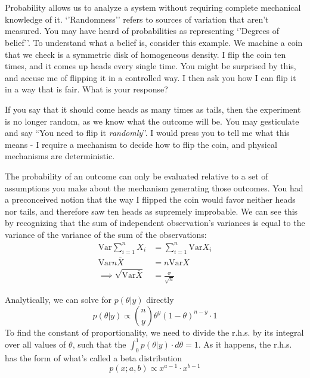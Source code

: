 \documentclass[11pt,a4paper,article]{memoir} %
\begin{document}
\chapter{}
Probability allows us to analyze a system without requiring complete mechanical knowledge of it. `'Randomness'' refers to sources of variation that aren't measured. You may have heard of probabilities as representing `'Degrees of belief''. To understand what a belief is, consider this example. We machine a coin that we check is a symmetric disk of homogeneous density. I flip the coin ten times, and it comes up heads every single time. You might be surprised by this, and accuse me of flipping it in a controlled way. I then ask you how I can flip it in a way that is fair. What is your response?
\par
If you say that it should come heads as many times as tails, then the experiment is no longer random, as we know what the outcome will be. You may gesticulate and say ``You need to flip it \emph{randomly}''. I would press you to tell me what this means - I require a mechanism to decide how to flip the coin, and physical mechanisms are deterministic.
\par
The probability of an outcome can only be evaluated relative to a set of assumptions you make about the mechanism generating those outcomes. You had a preconceived notion that the way I flipped the coin would favor neither heads nor tails, and therefore saw ten heads as supremely improbable.
\newpage
We can see this by recognizing that the sum of independent observation's variances is equal to the variance of the variance of the sum of the observations:
\begin{align}
 \text{Var}\sum_{i = 1}^n X_i &= \sum_{i = 1}^n \text{Var}X_i\\
	\text{Var}n\bar{X} &= n\text{Var}X \\
	\implies \sqrt{\text{Var}\bar{X}} &= \frac{\sigma}{\sqrt{n}}
\end{align}
\par
Analytically, we can solve for $p(\theta|y)$ directly
\[
  p(\theta|y) \propto \binom{n}{y}\theta^y (1 - \theta)^{n-y}\cdot 1
\]
To find the constant of proportionality, we need to divide the r.h.s. by its integral over all values of $\theta$, such that the $\int_0^1 p(\theta|y)\cdot d\theta = 1$. As it happens, the r.h.s. has the form of what's called a beta distribution
\[
  p(x; a, b) \propto x^{a - 1}\cdot x^{b-1}
\]
\end{document}
